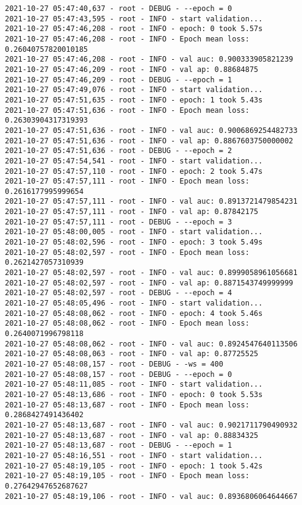 \documentclass[11pt]{article}
\begin{document}
\begin{verbatim}
2021-10-27 05:47:40,637 - root - DEBUG - --epoch = 0
2021-10-27 05:47:43,595 - root - INFO - start validation...
2021-10-27 05:47:46,208 - root - INFO - epoch: 0 took 5.57s
2021-10-27 05:47:46,208 - root - INFO - Epoch mean loss: 0.26040757820010185
2021-10-27 05:47:46,208 - root - INFO - val auc: 0.900333905821239
2021-10-27 05:47:46,209 - root - INFO - val ap: 0.88684875
2021-10-27 05:47:46,209 - root - DEBUG - --epoch = 1
2021-10-27 05:47:49,076 - root - INFO - start validation...
2021-10-27 05:47:51,635 - root - INFO - epoch: 1 took 5.43s
2021-10-27 05:47:51,636 - root - INFO - Epoch mean loss: 0.26303904317319393
2021-10-27 05:47:51,636 - root - INFO - val auc: 0.9006869254482733
2021-10-27 05:47:51,636 - root - INFO - val ap: 0.8867603750000002
2021-10-27 05:47:51,636 - root - DEBUG - --epoch = 2
2021-10-27 05:47:54,541 - root - INFO - start validation...
2021-10-27 05:47:57,110 - root - INFO - epoch: 2 took 5.47s
2021-10-27 05:47:57,111 - root - INFO - Epoch mean loss: 0.2616177995999654
2021-10-27 05:47:57,111 - root - INFO - val auc: 0.8913721479854231
2021-10-27 05:47:57,111 - root - INFO - val ap: 0.87842175
2021-10-27 05:47:57,111 - root - DEBUG - --epoch = 3
2021-10-27 05:48:00,005 - root - INFO - start validation...
2021-10-27 05:48:02,596 - root - INFO - epoch: 3 took 5.49s
2021-10-27 05:48:02,597 - root - INFO - Epoch mean loss: 0.2621427057310939
2021-10-27 05:48:02,597 - root - INFO - val auc: 0.8999058961056681
2021-10-27 05:48:02,597 - root - INFO - val ap: 0.8871543749999999
2021-10-27 05:48:02,597 - root - DEBUG - --epoch = 4
2021-10-27 05:48:05,496 - root - INFO - start validation...
2021-10-27 05:48:08,062 - root - INFO - epoch: 4 took 5.46s
2021-10-27 05:48:08,062 - root - INFO - Epoch mean loss: 0.2640071996798118
2021-10-27 05:48:08,062 - root - INFO - val auc: 0.8924547640113506
2021-10-27 05:48:08,063 - root - INFO - val ap: 0.87725525
2021-10-27 05:48:08,157 - root - DEBUG - -ws = 400
2021-10-27 05:48:08,157 - root - DEBUG - --epoch = 0
2021-10-27 05:48:11,085 - root - INFO - start validation...
2021-10-27 05:48:13,686 - root - INFO - epoch: 0 took 5.53s
2021-10-27 05:48:13,687 - root - INFO - Epoch mean loss: 0.2868427491436402
2021-10-27 05:48:13,687 - root - INFO - val auc: 0.9021711790490932
2021-10-27 05:48:13,687 - root - INFO - val ap: 0.88834325
2021-10-27 05:48:13,687 - root - DEBUG - --epoch = 1
2021-10-27 05:48:16,551 - root - INFO - start validation...
2021-10-27 05:48:19,105 - root - INFO - epoch: 1 took 5.42s
2021-10-27 05:48:19,105 - root - INFO - Epoch mean loss: 0.27642947652687627
2021-10-27 05:48:19,106 - root - INFO - val auc: 0.8936806064644667

\end{verbatim}
\end{document}
